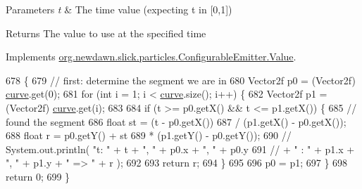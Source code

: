 \begin{DoxyParams}{Parameters}
{\em t} & The time value (expecting t in \mbox{[}0,1\mbox{]}) \\
\hline
\end{DoxyParams}
\begin{DoxyReturn}{Returns}
The value to use at the specified time 
\end{DoxyReturn}


Implements \mbox{\hyperlink{interfaceorg_1_1newdawn_1_1slick_1_1particles_1_1_configurable_emitter_1_1_value_aa5f167090202b78c65e324edd27e277c}{org.\+newdawn.\+slick.\+particles.\+Configurable\+Emitter.\+Value}}.


\begin{DoxyCode}
678                                        \{
679             \textcolor{comment}{// first: determine the segment we are in}
680             Vector2f p0 = (Vector2f) \mbox{\hyperlink{classorg_1_1newdawn_1_1slick_1_1particles_1_1_configurable_emitter_1_1_linear_interpolator_a2029dd987ff4a634d2bc06e5828852c4}{curve}}.get(0);
681             \textcolor{keywordflow}{for} (\textcolor{keywordtype}{int} i = 1; i < \mbox{\hyperlink{classorg_1_1newdawn_1_1slick_1_1particles_1_1_configurable_emitter_1_1_linear_interpolator_a2029dd987ff4a634d2bc06e5828852c4}{curve}}.size(); i++) \{
682                 Vector2f p1 = (Vector2f) \mbox{\hyperlink{classorg_1_1newdawn_1_1slick_1_1particles_1_1_configurable_emitter_1_1_linear_interpolator_a2029dd987ff4a634d2bc06e5828852c4}{curve}}.get(i);
683 
684                 \textcolor{keywordflow}{if} (t >= p0.getX() && t <= p1.getX()) \{
685                     \textcolor{comment}{// found the segment}
686                     \textcolor{keywordtype}{float} st = (t - p0.getX())
687                             / (p1.getX() - p0.getX());
688                     \textcolor{keywordtype}{float} r = p0.getY() + st
689                             * (p1.getY() - p0.getY());
690                     \textcolor{comment}{// System.out.println( "t: " + t + ", " + p0.x + ", " + p0.y}
691                     \textcolor{comment}{// + " : " + p1.x + ", " + p1.y + " => " + r );}
692 
693                     \textcolor{keywordflow}{return} r;
694                 \}
695 
696                 p0 = p1;
697             \}
698             \textcolor{keywordflow}{return} 0;
699         \}
\end{DoxyCode}
\mbox{\label{classorg_1_1newdawn_1_1slick_1_1particles_1_1_configurable_emitter_1_1_linear_interpolator_aaa42a37231bfb5ea8a52b687e5feca3b}} 
